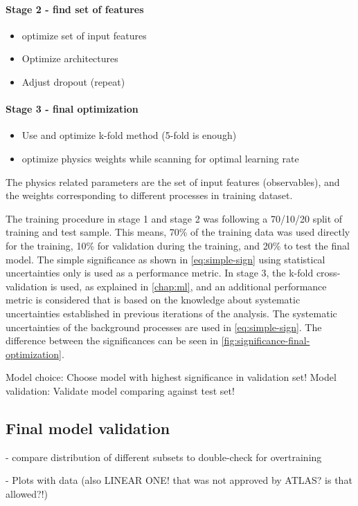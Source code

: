 \paragraph{Stage 2 - find set of features}
\begin{itemize}
    \item optimize set of input features
    \item Optimize architectures
    \item Adjust dropout (repeat)
\end{itemize}

\paragraph{Stage 3 - final optimization}
\begin{itemize}
    \item Use and optimize k-fold method (5-fold is enough)
    \item optimize physics weights while scanning for optimal learning rate
\end{itemize}

The physics related parameters are the set of input features (observables), and the weights corresponding to different processes in training dataset. 

The training procedure in stage 1 and stage 2 was following a 70/10/20 split of training and test sample. This means, 70\% of the training data was used directly for the training, 10\% for validation during the training, and 20\% to test the final model. The simple significance as shown in \cref{eq:simple-sign} using statistical uncertainties only is used as a performance metric.
In stage 3, the k-fold cross-validation is used, as explained in \cref{chap:ml}, and an additional performance metric is considered that is based on the knowledge about systematic uncertainties established in previous iterations of the analysis. The systematic uncertainties of the background processes are used in \cref{eq:simple-sign}. The difference between the significances can be seen in \cref{fig:significance-final-optimization}.

Model choice: Choose model with highest significance in validation set!
Model validation: Validate model comparing against test set!




\subsection{Final model validation}

- compare distribution of different subsets to double-check for overtraining

- Plots with data (also LINEAR ONE! that was not approved by ATLAS? is that allowed?!)



